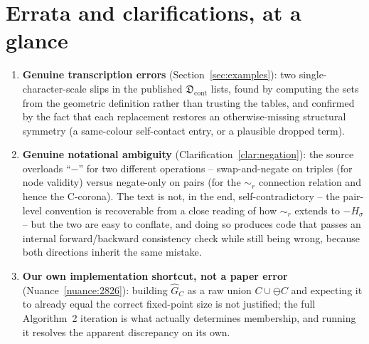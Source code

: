 \documentclass[11pt]{article}
\begin{document}
\section{Errata and clarifications, at a glance}\label{sec:errata}

\begin{enumerate}[leftmargin=1.5em]
\item \textbf{Genuine transcription errors} (Section~\ref{sec:examples}):
two single-character-scale slips in the published $\mathfrak{D}_{\mathrm{cont}}$
lists, found by computing the sets from the geometric definition rather than
trusting the tables, and confirmed by the fact that each replacement
restores an otherwise-missing structural symmetry (a same-colour self-contact
entry, or a plausible dropped term).
\item \textbf{Genuine notational ambiguity} (Clarification~\ref{clar:negation}):
the source overloads ``$-$'' for two different operations -- swap-and-negate
on triples (for node validity) versus negate-only on pairs (for the $\sim_r$
connection relation and hence the C-corona). The text is not, in the end,
self-contradictory -- the pair-level convention is recoverable from a close
reading of how $\sim_r$ extends to $-H_\sigma$ -- but the two are easy to
conflate, and doing so produces code that passes an internal
forward/backward consistency check while still being wrong, because both
directions inherit the same mistake.
\item \textbf{Our own implementation shortcut, not a paper error}
(Nuance~\ref{nuance:2826}): building $\hat G_C$ as a raw union $C\cup\ominus C$
and expecting it to already equal the correct fixed-point size is not
justified; the full Algorithm~2 iteration is what actually determines
membership, and running it resolves the apparent discrepancy on its own.
\end{enumerate}
\end{document}
